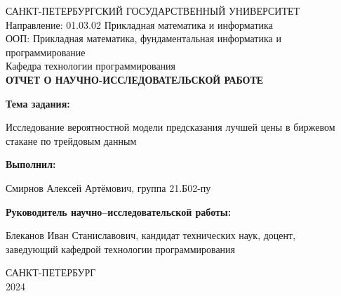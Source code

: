 \documentclass[12pt, a4paper]{article}
\begin{document}
\pagestyle{fancy}
\fancyhf{}
\renewcommand{\headrulewidth}{0pt}

\begin{center}
САНКТ-ПЕТЕРБУРГСКИЙ ГОСУДАРСТВЕННЫЙ УНИВЕРСИТЕТ\\
Направление: 01.03.02 Прикладная математика и информатика \\
ООП: Прикладная математика, фундаментальная информатика и программирование \\
Кафедра технологии программирования \\

\vspace*{2cm}
\large \textbf{ОТЧЕТ О НАУЧНО-ИССЛЕДОВАТЕЛЬСКОЙ РАБОТЕ}
\end{center}
\vspace*{1.5cm}

\begin{flushleft}
\textbf{Тема задания:}
\end{flushleft}
\hspace{1cm} Исследование вероятностной модели предсказания лучшей цены в биржевом \\ стакане по трейдовым данным
\vspace*{0.5cm}

\begin{flushleft}
\textbf{Выполнил:}
\end{flushleft}
\hspace{1cm} Смирнов Алексей Артёмович, группа 21.Б02-пу 
\vspace*{0.5cm}

\begin{flushleft}
\textbf{Руководитель научно--исследовательской работы:}
\end{flushleft}
\hspace{1cm} Блеканов Иван Станиславович, кандидат технических наук, доцент, \\ заведующий кафедрой технологии программирования
 
 
\vspace*{7cm}
\begin{center}
САНКТ-ПЕТЕРБУРГ \\
2024
\end{center}

\newpage

\renewcommand{\contentsname}{\begin{center}Содержание\end{center}}
\tableofcontents

\newpage

\fancyfoot[C]{\thepage}
\end{document}
